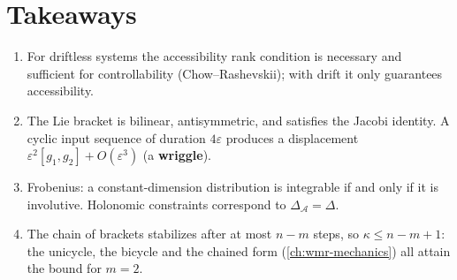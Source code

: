 \section{Takeaways}
\label{sec:controllability-takeaways}

\begin{enumerate}
    \item For driftless systems the accessibility rank condition is
          necessary and sufficient for controllability
          (Chow--Rashevskii); with drift it only guarantees
          accessibility.
    \item The Lie bracket is bilinear, antisymmetric, and satisfies the
          Jacobi identity. A cyclic input sequence of duration
          \( 4\varepsilon \) produces a displacement
          \( \varepsilon^2 [g_1, g_2] + O(\varepsilon^3) \) (a
          \textbf{wriggle}).
    \item Frobenius: a constant-dimension distribution is integrable if
          and only if it is involutive. Holonomic constraints
          correspond to \( \Delta_{\mathcal{A}} = \Delta \).
    \item The chain of brackets stabilizes after at most \( n - m \)
          steps, so \( \kappa \le n - m + 1 \): the unicycle, the
          bicycle and the chained form (\cref{ch:wmr-mechanics}) all
          attain the bound for \( m = 2 \).
\end{enumerate}